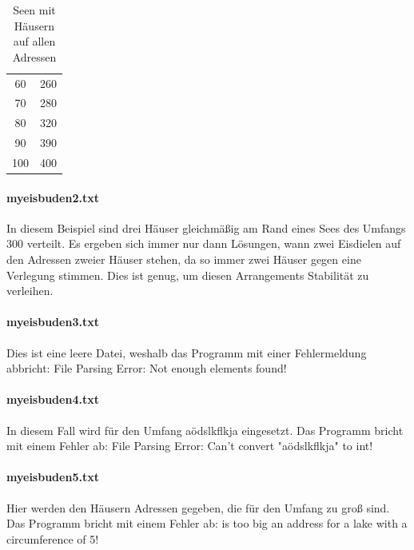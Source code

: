 \documentclass[a4paper,10pt,ngerman,captions=figureheading]{scrartcl}
\begin{document}
\begin{table}[ht]
\begin{center}
\begin{tabularx}{\linewidth}{c|c}
            60              & 260                                  \\
            70              & 280                                  \\
            80              & 320                                  \\
            90              & 390                                  \\
            100             & 400
        \end{tabularx}
        \caption{Seen mit Häusern auf allen Adressen}
        \label{tab:Häuser_auf_allen_Adressen}
    \end{center}
\end{table}

\paragraph{myeisbuden2.txt}
In diesem Beispiel sind drei Häuser gleichmäßig am Rand eines Sees des Umfangs $300$ verteilt.
Es ergeben sich immer nur dann Lösungen, wann zwei Eisdielen auf den Adressen zweier Häuser stehen, da so immer zwei Häuser gegen eine Verlegung stimmen.
Dies ist genug, um diesen Arrangements Stabilität zu verleihen.

\paragraph{myeisbuden3.txt}
Dies ist eine leere Datei, weshalb das Programm mit einer Fehlermeldung abbricht: \glqq File Parsing Error: Not enough elements found!\grqq{}

\paragraph{myeisbuden4.txt}
In diesem Fall wird für den Umfang \glqq aödslkflkja\grqq{} eingesetzt.
Das Programm bricht mit einem Fehler ab: \glqq File Parsing Error: Can't convert "aödslkflkja" to int!\grqq{}

\paragraph{myeisbuden5.txt}
Hier werden den Häusern Adressen gegeben, die für den Umfang zu groß sind.
Das Programm bricht mit einem Fehler ab:  is too big an address for a lake with a circumference of 5!\grqq{}
\end{document}
